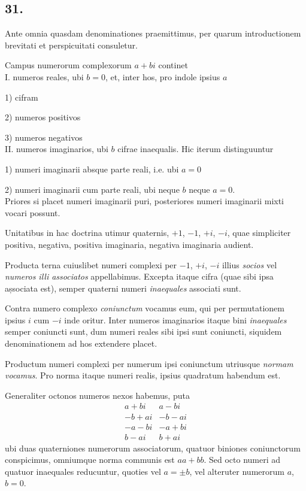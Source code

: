 \documentclass[twoside,12pt, showframe]{memoir}
\begin{document}
\subsection*{31.}
 
Ante omnia quasdam denominationes praemittimus, per quarum introductionem brevitati et perspicuitati consuletur.
 
Campus numerorum complexorum \(a+b i\) continet\\
I. numeros reales, ubi \(b=0\), et, inter hos, pro indole ipsius \(a\)
 
1) cifram
 
2) numeros positivos
 
3) numeros negativos\\
II. numeros imaginarios, ubi \(b\) cifrae inaequalis. Hic iterum distinguuntur
 
1) numeri imaginarii absque parte reali, i.e. ubi \(a=0\)
 
2) numeri imaginarii cum parte reali, ubi neque \(b\) neque \(a=0\).\\
Priores si placet numeri imaginarii puri, posteriores numeri imaginarii mixti vocari possunt.\clearpage\noindent%

Unitatibus in hac doctrina utimur quaternis, \(+1\), \(-1\), \(+i\), \(-i\), quae simpliciter positiva, negativa, positiva imaginaria, negativa imaginaria audient.
 
Producta terna cuiuslibet numeri complexi per \(-1\), \(+i\), \(-i\) illius \textit{socios} vel \textit{numeros illi associatos} appellabimus. Excepta itaque cifra (quae sibi ipsa așsociata est), semper quaterni numeri \textit{inaequales} associati sunt.
 
Contra numero complexo \textit{coniunctum} vocamus eum, qui per permutationem ipsius \(i\) cum \(-i\) inde oritur. Inter numeros imaginarios itaque bini \textit{inaequales} semper coniuncti sunt, dum numeri reales sibi ipsi sunt coniuncti, siquidem denominationem ad hos extendere placet.
 
Productum numeri complexi per numerum ipsi coniunctum utriusque \textit{normam vocamus}. Pro norma itaque numeri realis, ipsius quadratum habendum est.
 
Generaliter octonos numeros nexos habemus, puta
\[\begin{array}{r|r}
a+b i & a-b i \\
-b+a i & -b-a i \\
-a-b i & -a+b i \\
b-a i & b+a i
\end{array}\]
ubi duas quaterniones numerorum associatorum, quatuor biniones coniunctorum conspicimus, omniumque norma communis est \(a a+b b\). Sed octo numeri ad quatuor inaequales reducuntur, quoties vel \(a= \pm b\), vel alteruter numerorum \(a\), \(b=0\).
 
\end{document}
